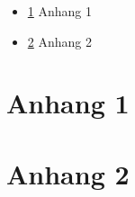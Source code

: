 
\begin{itemize}
	\item \ref{apx:1} Anhang 1 \dotfill{} \pageref{apx:1}
	\item \ref{apx:2} Anhang 2 \dotfill{} \pageref{apx:2}
\end{itemize}

\chapter{Anhang 1}
\label{apx:1}

\chapter{Anhang 2}
\label{apx:2}
